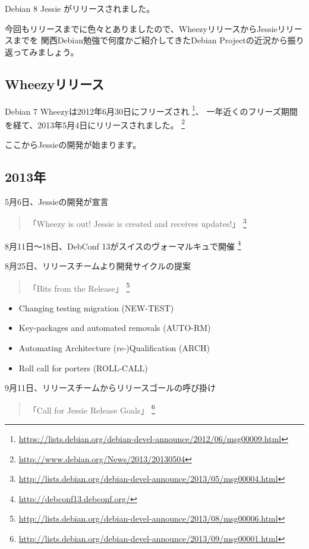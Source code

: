 \documentclass[mingoth,a4paper]{jsarticle}
\begin{document}
Debian 8 Jessie がリリースされました。

今回もリリースまでに色々とありましたので、WheezyリリースからJessieリリースまでを
関西Debian勉強で何度かご紹介してきたDebian Projectの近況から振り返ってみましょう。

\subsection{Wheezyリリース}

Debian 7 Wheezyは2012年6月30日にフリーズされ
\footnote{\url{https://lists.debian.org/debian-devel-announce/2012/06/msg00009.html}}、
一年近くのフリーズ期間を経て、2013年5月4日にリリースされました。
\footnote{\url{http://www.debian.org/News/2013/20130504}}

ここからJessieの開発が始まります。


\subsection{2013年}

5月6日、Jessieの開発が宣言
\begin{quote}
  「Wheezy is out! Jessie is created and receives updates!」
  \footnote{\url{http://lists.debian.org/debian-devel-announce/2013/05/msg00004.html}}
\end{quote}

8月11日〜18日、DebConf 13がスイスのヴォーマルキュで開催
\footnote{\url{http://debconf13.debconf.org/}}

8月25日、リリースチームより開発サイクルの提案
\begin{quote}
  「Bits from the Release」
  \footnote{\url{http://lists.debian.org/debian-devel-announce/2013/08/msg00006.html}}
\end{quote}

\begin{screen}
  \begin{itemize}
  \item Changing testing migration (NEW-TEST)
  \item Key-packages and automated removals (AUTO-RM)
  \item Automating Architecture (re-)Qualification (ARCH)
  \item Roll call for porters (ROLL-CALL)
  \end{itemize}
\end{screen}

9月11日、リリースチームからリリースゴールの呼び掛け
\begin{quote}
  「Call for Jessie Release Goals」
  \footnote{\url{http://lists.debian.org/debian-devel-announce/2013/09/msg00001.html}}
\end{quote}
\end{document}
